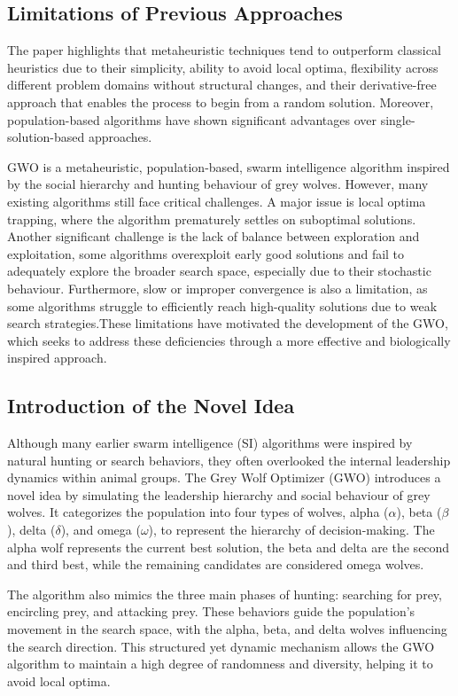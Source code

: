 \documentclass[a4paper, 12pt]{extarticle}
\begin{document}
\subsection{Limitations of Previous Approaches}
The paper \cite{mirjalili2014grey} highlights that metaheuristic techniques tend to outperform classical heuristics due to their simplicity, ability to avoid local optima, flexibility across different problem domains without structural changes, and their derivative-free approach that enables the process to begin from a random solution. Moreover, population-based algorithms have shown significant advantages over single-solution-based approaches.

GWO is a metaheuristic, population-based, swarm intelligence algorithm inspired by the social hierarchy and hunting behaviour of grey wolves. However, many existing algorithms still face critical challenges. A major issue is local optima trapping, where the algorithm prematurely settles on suboptimal solutions. Another significant challenge is the lack of balance between exploration and exploitation, some algorithms overexploit early good solutions and fail to adequately explore the broader search space, especially due to their stochastic behaviour. Furthermore, slow or improper convergence is also a limitation, as some algorithms struggle to efficiently reach high-quality solutions due to weak search strategies.These limitations have motivated the development of the GWO, which seeks to address these deficiencies through a more effective and biologically inspired approach. 

\subsection{Introduction of the Novel Idea}
Although many earlier swarm intelligence (SI) algorithms were inspired by natural hunting or search behaviors, they often overlooked the internal leadership dynamics within animal groups. The Grey Wolf Optimizer (GWO) introduces a novel idea by simulating the leadership hierarchy and social behaviour of grey wolves. It categorizes the population into four types of wolves, alpha ($\alpha$), beta ($\beta$), delta ($\delta$), and omega ($\omega$), to represent the hierarchy of decision-making. The alpha wolf represents the current best solution, the beta and delta are the second and third best, while the remaining candidates are considered omega wolves.

The algorithm also mimics the three main phases of hunting: searching for prey, encircling prey, and attacking prey. These behaviors guide the population’s movement in the search space, with the alpha, beta, and delta wolves influencing the search direction. This structured yet dynamic mechanism allows the GWO algorithm to maintain a high degree of randomness and diversity, helping it to avoid local optima. \cite{kandasamy2020literature}
\end{document}
